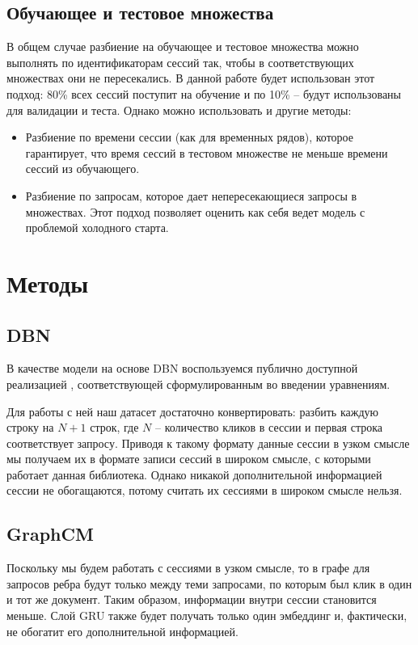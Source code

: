 \documentclass[diploma]{nanolab2015}
\begin{document}
\subsection{Обучающее и тестовое множества}
В общем случае разбиение на обучающее и тестовое множества можно выполнять по идентификаторам сессий так, чтобы в соответствующих множествах они не пересекались. В данной работе будет использован этот подход: 80\% всех сессий поступит на обучение и по 10\% -- будут использованы для валидации и теста. Однако можно использовать и другие методы:
\begin{itemize}
    \item Разбиение по времени сессии (как для временных рядов), которое гарантирует, что время сессий в тестовом множестве не меньше времени сессий из обучающего.
    \item Разбиение по запросам, которое дает непересекающиеся запросы в множествах. Этот подход позволяет оценить как себя ведет модель с проблемой холодного старта.
\end{itemize}

\section{Методы}
\subsection{DBN}
В качестве модели на основе DBN воспользуемся публично доступной реализацией \cite{dbngithub}, соответствующей сформулированным во введении уравнениям.

Для работы с ней наш датасет достаточно конвертировать: разбить каждую строку на $N+1$ строк, где $N$ -- количество кликов в сессии и первая строка соответствует запросу. Приводя к такому формату данные сессии в узком смысле мы получаем их в формате записи сессий в широком смысле, с которыми работает данная библиотека. Однако никакой дополнительной информацией сессии не обогащаются, потому считать их сессиями в широком смысле нельзя.

\subsection{GraphCM}
Поскольку мы будем работать с сессиями в узком смысле, то в графе для запросов ребра будут только между теми запросами, по которым был клик в один и тот же документ. Таким образом, информации внутри сессии становится меньше. Слой GRU также будет получать только один эмбеддинг и, фактически, не обогатит его дополнительной информацией.
\end{document}
